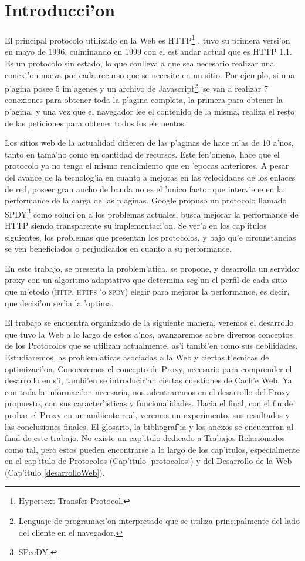 \chapter{Introducci'on}

El principal protocolo utilizado en la Web es HTTP\footnote{Hypertext Transfer Protocol.} \citep{rfcHTTP1.1}, tuvo su primera versi'on en mayo de 1996, culminando en 1999 con el est'andar actual que es HTTP 1.1. Es un protocolo sin estado, lo que conlleva a que sea necesario realizar una conexi'on nueva por cada recurso que se necesite en un sitio. Por ejemplo, si una p'agina posee 5 im'agenes y un archivo de Javascript\footnote{Lenguaje de programaci'on interpretado que se utiliza principalmente del lado del cliente en el navegador.}, se van a realizar 7 conexiones para obtener toda la p'agina completa, la primera para obtener la p'agina, y una vez que el navegador lee el contenido de la misma, realiza el resto de las peticiones para obtener todos los elementos.

Los sitios web de la actualidad difieren de las p'aginas de hace m'as de 10 a'nos, tanto en tama'no como en cantidad de recursos. Este fen'omeno, hace que el protocolo ya no tenga el mismo rendimiento que en 'epocas anteriores. A pesar del avance de la tecnolog'ia en cuanto a mejoras en las velocidades de los enlaces de red, poseer gran ancho de banda no es el 'unico factor que interviene en la performance de la carga de las p'aginas.
Google propuso un protocolo llamado SPDY\footnote{SPeeDY.} como soluci'on a los problemas actuales, busca mejorar la performance de HTTP siendo transparente su implementaci'on.
Se ver'a en los cap'itulos siguientes, los problemas que presentan los protocolos, y bajo qu'e circunstancias se ven beneficiados o perjudicados en cuanto a su performance.

En este trabajo, se presenta la problem'atica, se propone, y desarrolla un servidor proxy con un algoritmo adaptativo que determina seg'un el perfil de cada sitio que m'etodo (\textsc{http}, \textsc{https} 'o \textsc{spdy}) elegir para mejorar la performance, es decir, que decisi'on ser'ia la 'optima.

El trabajo se encuentra organizado de la siguiente manera, veremos el desarrollo que tuvo la Web a lo largo de estos a'nos, avanzaremos sobre diversos conceptos de los Protocolos que se utilizan actualmente, as'i tambi'en como sus debilidades. Estudiaremos las problem'aticas asociadas a la Web y ciertas t'ecnicas de optimizaci'on. Conoceremos el concepto de Proxy, necesario para comprender el desarrollo en s'i, tambi'en se introducir'an ciertas cuestiones de Cach'e Web. Ya con toda la informaci'on necesaria, nos adentraremos en el desarrollo del Proxy propuesto, con sus caracter'isticas y funcionalidades. Hacia el final, con el fin de probar el Proxy en un ambiente real, veremos un experimento, sus resultados y las conclusiones finales. El glosario, la bibliograf'ia y los anexos se encuentran al final de este trabajo. No existe un cap'itulo dedicado a Trabajos Relacionados como tal, pero estos pueden encontrarse a lo largo de los cap'itulos, especialmente en el cap'itulo de Protocolos (Cap'itulo \ref{protocolos}) y del Desarrollo de la Web (Cap'itulo \ref{desarrolloWeb}).